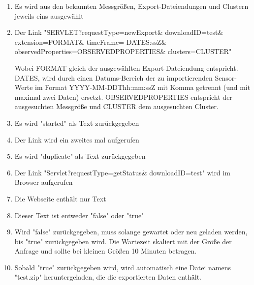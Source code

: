 \begin{enumerate}
\item Es wird aus den bekannten Messgrößen, Export-Dateiendungen und Clustern jeweils eins ausgewählt
\item Der Link "SERVLET?requestType=newExport\& downloadID=test\& extension=FORMAT\& timeFrame= DATES:ssZ\& observedProperties=\newline OBSERVEDPROPERTIES\& clusters=CLUSTER"
\par
Wobei FORMAT gleich der ausgewählten Export-Dateiendung entspricht. DATES, wird durch einen Datums-Bereich der zu importierenden Sensor-Werte im Format YYYY-MM-DDThh:mm:ssZ mit Komma getrennt (und mit maximal zwei Daten) ersetzt. OBSERVEDPROPERTIES entspricht der ausgesuchten Messgröße und CLUSTER dem ausgesuchten Cluster.
\item Es wird "started" als Text zurückgegeben
\item Der Link wird ein zweites mal aufgerufen
\item Es wird "duplicate" als Text zurückgegeben
\item Der Link "Servlet?requestType=getStatus\& downloadID=test" wird im Browser aufgerufen
\item Die Webseite enthält nur Text
\item Dieser Text ist entweder "false" oder "true"
\item Wird "false" zurückgegeben, muss solange gewartet oder neu geladen werden, bis "true" zurückgegeben wird. 
\newline
Die Wartezeit skaliert mit der Größe der Anfrage und sollte bei kleinen Größen 10 Minuten betragen.
\item Sobald "true" zurückgegeben wird, wird automatisch eine Datei namens "test.zip" heruntergeladen, die die exportierten Daten enthält.
\end{enumerate}
\szenarioGood